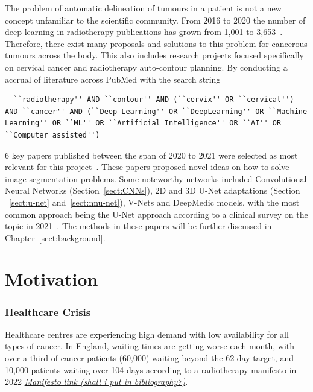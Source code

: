 \documentclass[12pt,twoside]{report}
\begin{document}
The problem of automatic delineation of tumours in a patient is not a new concept unfamiliar to the scientific community. From 2016 to 2020 the number of deep-learning in radiotherapy publications has grown from 1,001 to 3,653~\cite{Lin2021-oz}. Therefore, there exist many proposals and solutions to this problem for cancerous tumours across the body. This also includes research projects focused specifically on cervical cancer and radiotherapy auto-contour planning. By conducting a accrual of literature across PubMed with the search string

\begin{lstlisting}
  ``radiotherapy'' AND ``contour'' AND (``cervix'' OR ``cervical'') AND ``cancer'' AND (``Deep Learning'' OR ``DeepLearning'' OR ``Machine Learning'' OR ``ML'' OR ``Artificial Intelligence'' OR ``AI'' OR ``Computer assisted'')  
\end{lstlisting}

6 key papers published between the span of 2020 to 2021 were selected as most relevant for this project~\cite{Samarasinghe2021-ps,Lin2021-oz,Sartor2020-et,LIU2020184,Rhee2020-ms,LIU2020172}. These papers proposed novel ideas on how to solve image segmentation problems. Some noteworthy networks included Convolutional Neural Networks (Section~\ref{sect:CNNs}), 2D and 3D U-Net adaptations (Section ~\ref{sect:u-net} and~\ref{sect:nnu-net}), V-Nets and DeepMedic models, with the most common approach being the U-Net approach according to a clinical survey on the topic in 2021~\cite{Samarasinghe2021-ps}. The methods in these papers will be further discussed in Chapter~\ref{sect:background}.

\section{Motivation}\label{sect:motivation}

\subsubsection{Healthcare Crisis}

Healthcare centres are experiencing high demand with low availability for all types of cancer. In England, waiting times are getting worse each month, with over a third of cancer patients (60,000) waiting beyond the 62-day target, and 10,000 patients waiting over 104 days according to a radiotherapy manifesto in 2022 \href{https://radiotherapy.org.uk/wp-content/uploads/2022/11/APPGRadiotherapy_Manifesto-Update_2022.pdf}{\textit{Manifesto link (shall i put in bibliography?)}}. 
\end{document}
